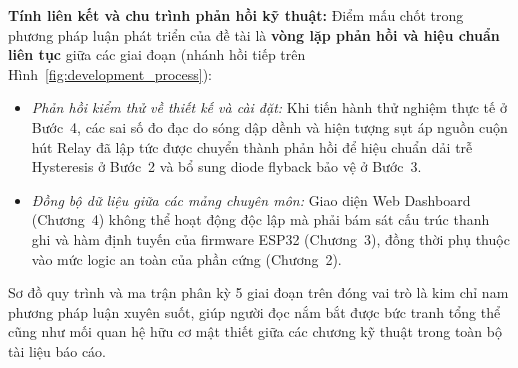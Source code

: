 \noindent
\textbf{Tính liên kết và chu trình phản hồi kỹ thuật:} Điểm mấu chốt trong phương pháp luận phát triển của đề tài là \textbf{vòng lặp phản hồi và hiệu chuẩn liên tục} giữa các giai đoạn (nhánh hồi tiếp trên Hình~\ref{fig:development_process}):
\begin{itemize}
    \setlength{\itemsep}{0pt}
    \setlength{\parskip}{0pt}
    \setlength{\parsep}{0pt}
    \item \textit{Phản hồi kiểm thử về thiết kế và cài đặt:} Khi tiến hành thử nghiệm thực tế ở Bước~4, các sai số đo đạc do sóng dập dềnh và hiện tượng sụt áp nguồn cuộn hút Relay đã lập tức được chuyển thành phản hồi để hiệu chuẩn dải trễ Hysteresis ở Bước~2 và bổ sung diode flyback bảo vệ ở Bước~3.
    \item \textit{Đồng bộ dữ liệu giữa các mảng chuyên môn:} Giao diện Web Dashboard (Chương~4) không thể hoạt động độc lập mà phải bám sát cấu trúc thanh ghi và hàm định tuyến của firmware ESP32 (Chương~3), đồng thời phụ thuộc vào mức logic an toàn của phần cứng (Chương~2).
\end{itemize}

Sơ đồ quy trình và ma trận phân kỳ 5 giai đoạn trên đóng vai trò là kim chỉ nam phương pháp luận xuyên suốt, giúp người đọc nắm bắt được bức tranh tổng thể cũng như mối quan hệ hữu cơ mật thiết giữa các chương kỹ thuật trong toàn bộ tài liệu báo cáo.
